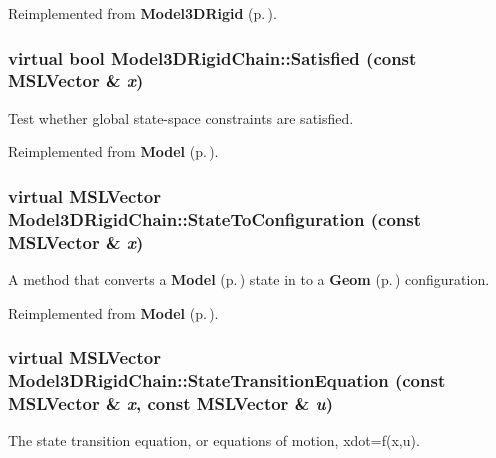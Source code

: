 Reimplemented from {\bf Model3DRigid} {\rm (p.\,\pageref{class_Model3DRigid_a4})}.
\subsubsection{\setlength{\rightskip}{0pt plus 5cm}virtual bool Model3DRigid\-Chain::Satisfied (const {\bf MSLVector} \& {\em x})\hspace{0.3cm}{\tt  [virtual]}}\label{class_Model3DRigidChain_a6}


Test whether global state-space constraints are satisfied.



Reimplemented from {\bf Model} {\rm (p.\,\pageref{class_Model_a4})}.
\subsubsection{\setlength{\rightskip}{0pt plus 5cm}virtual {\bf MSLVector} Model3DRigid\-Chain::State\-To\-Configuration (const {\bf MSLVector} \& {\em x})\hspace{0.3cm}{\tt  [virtual]}}\label{class_Model3DRigidChain_a3}


A method that converts a {\bf Model} {\rm (p.\,\pageref{class_Model})} state in to a {\bf Geom} {\rm (p.\,\pageref{class_Geom})} configuration.



Reimplemented from {\bf Model} {\rm (p.\,\pageref{class_Model_a8})}.
\subsubsection{\setlength{\rightskip}{0pt plus 5cm}virtual {\bf MSLVector} Model3DRigid\-Chain::State\-Transition\-Equation (const {\bf MSLVector} \& {\em x}, const {\bf MSLVector} \& {\em u})\hspace{0.3cm}{\tt  [virtual]}}\label{class_Model3DRigidChain_a2}


The state transition equation, or equations of motion, xdot=f(x,u).




